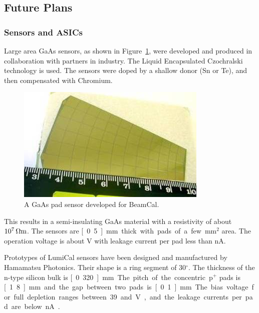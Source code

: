 \subsection{Future Plans}

\subsubsection{Sensors and ASICs}
Large area GaAs sensors, as shown in Figure~\ref{fig:GaAs}, were developed
and produced in collaboration with partners in industry. The Liquid Encapsulated
Czochralski technology is used. The sensors were
doped by a shallow donor (Sn or Te),
and then compensated with Chromium.
\begin{figure}[hbp]
\begin{center}
    \includegraphics[width=0.8\columnwidth]{Calorimeter/FCAL/figs/GaAs_sensor_new.jpg}
  \end{center}
          \caption{A GaAs pad sensor developed for BeamCal.}
    \label{fig:GaAs}
\end{figure}
This results in a semi-insulating GaAs material with a resistivity of about $\unit[10^7]{\Omega m}$.
The sensors are \unit[0.5]{mm} thick with pads of a few mm$^2$ area. The operation voltage is about \unit[100]{V} with
leakage current per pad less than \unit[500]{nA}.

Prototypes of LumiCal sensors have been designed
and manufactured by Hamamatsu
Photonics.
Their shape is a ring segment of 30$^\circ$.
The thickness of the n-type silicon bulk is \unit[0.320]{mm}.
The pitch of the concentric p$^+$ pads is \unit[1.8]{mm} and
the gap between two pads is \unit[0.1]{mm}.
The bias voltage for full depletion ranges between 39 and \unit[45]{V},
and the leakage currents per pad are below \unit[5]{nA}~\cite{eudet2009}.

